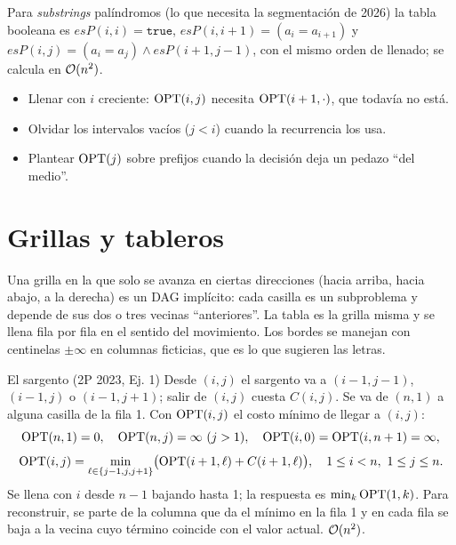Para \emph{substrings} palíndromos (lo que necesita la segmentación de 2026)
la tabla booleana es $\mathit{esP}(i,i)=\texttt{true}$,
$\mathit{esP}(i,i+1)=(a_i=a_{i+1})$ y $\mathit{esP}(i,j)=(a_i=a_j)\wedge \mathit{esP}(i+1,j-1)$, con el
mismo orden de llenado; se calcula en $\mathcal{O}(n^2)$.

\begin{trampa}[intervalos]
\begin{itemize}[leftmargin=1.2em]
  \item Llenar con $i$ creciente: $\mathrm{OPT}(i,j)$ necesita $\mathrm{OPT}(i+1,\cdot)$, que
  todavía no está.
  \item Olvidar los intervalos vacíos ($j<i$) cuando la recurrencia los usa.
  \item Plantear $\mathrm{OPT}(j)$ sobre prefijos cuando la decisión deja un
  pedazo ``del medio''.
\end{itemize}
\end{trampa}

\section{Grillas y tableros}

Una grilla en la que solo se avanza en ciertas direcciones (hacia arriba,
hacia abajo, a la derecha) es un DAG implícito: cada casilla es un
subproblema y depende de sus dos o tres vecinas ``anteriores''. La tabla es
la grilla misma y se llena fila por fila en el sentido del movimiento. Los
bordes se manejan con centinelas $\pm\infty$ en columnas ficticias, que es lo
que sugieren las letras.

\begin{problema}{El sargento (2P 2023, Ej. 1)}
Desde $(i,j)$ el sargento va a $(i-1,j-1)$, $(i-1,j)$ o $(i-1,j+1)$; salir
de $(i,j)$ cuesta $C(i,j)$. Se va de $(n,1)$ a alguna casilla de la fila 1.
Con $\mathrm{OPT}(i,j)$ el costo mínimo de llegar a $(i,j)$:
\[
\OPT(n,1)=0,\quad \OPT(n,j)=\infty\ (j>1),\quad \OPT(i,0)=\OPT(i,n+1)=\infty,
\]
\[
\mathrm{OPT}(i,j)=\min_{\ell\in\{j-1,j,j+1\}}\bigl(\mathrm{OPT}(i+1,\ell)+C(i+1,\ell)\bigr),\quad 1\le i<n,\ 1\le j\le n.
\]
Se llena con $i$ desde $n-1$ bajando hasta 1; la respuesta es
$\min_k\mathrm{OPT}(1,k)$. Para reconstruir, se parte de la columna que da el mínimo
en la fila 1 y en cada fila se baja a la vecina cuyo término coincide con el
valor actual. $\mathcal{O}(n^2)$.
\end{problema}

